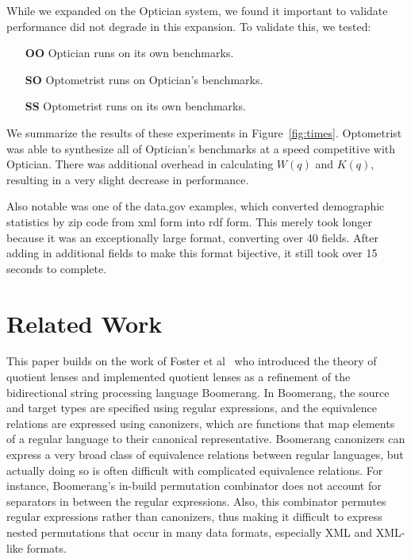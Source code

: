 \documentclass[acmsmall,review,anonymous]{acmart}\settopmatter{printfolios=true,printccs=false,printacmref=false}
\newcommand{\FINISH}[3]{\ifdraft\textcolor{#1}{[#2: #3]}\fi}
\newcommand{\sam}[1]{\FINISH{dkpurple}{SM}{#1}}
\newcommand{\Name}{Optometrist}
\newcommand{\OpticianRuntime}{\textbf{OO}}
\newcommand{\SystemOnOptician}{\textbf{SO}}
\newcommand{\SystemOnBenchmarks}{\textbf{SS}}
\begin{document}
While we expanded on the Optician system, we found it important to validate
performance did not degrade in this expansion.  To validate this, we tested:
\begin{itemize}
  \item[\OpticianRuntime{}] Optician runs on its own benchmarks.
  \item[\SystemOnOptician{}] \Name{} runs on Optician's benchmarks.
  \item[\SystemOnBenchmarks{}] \Name{} runs on its own benchmarks.
\end{itemize}

We summarize the results of these experiments in Figure~\ref{fig:times}.
\Name{} was
able to synthesize all of Optician's benchmarks at a speed competitive with
Optician.  There was additional overhead in calculating $W(q)$ and $K(q)$,
resulting in a very slight decrease in performance.

Also notable was one of the data.gov examples, which converted demographic
statistics by zip code from xml form into rdf form.  This merely took longer because it was
an exceptionally large format, converting over 40 fields.  After adding in additional
fields to make this format bijective, it still took over 15 seconds to complete.

\section{Related Work}
\label{relwork}

This paper builds on the work of Foster et al~\cite{quotientlenses} who
introduced the theory of quotient lenses and implemented quotient lenses as a
refinement of the bidirectional string processing language Boomerang.
In Boomerang, the source and target types are specified using regular
expressions, and the equivalence relations are expressed using canonizers, which
are functions that map elements of a regular language to their canonical
representative. Boomerang canonizers can express a very broad class of
equivalence relations between regular languages, but actually doing so is often
difficult with complicated equivalence relations. For instance, Boomerang's
in-build permutation combinator does not account for separators in between the
regular expressions. Also, this combinator permutes regular expressions rather
than canonizers, thus making it difficult to express nested permutations that
occur in many data formats, especially XML and XML-like formats.
\end{document}

